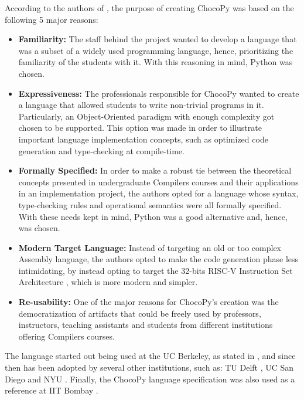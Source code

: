 \begin{itemize}
    According to the authors of \cite{padhye2019chocopy}, the purpose of creating ChocoPy was based on the following 5 major reasons:
    \begin{itemize}
        \item \textbf{Familiarity:} The staff behind the project wanted to develop a language that was a subset of a widely used programming language, hence, prioritizing the familiarity of the students with it. With this reasoning in mind, Python \cite{python_language} was chosen.
        \item \textbf{Expressiveness:} The professionals responsible for ChocoPy wanted to create a language that allowed students to write non-trivial programs in it. Particularly, an Object-Oriented paradigm with enough complexity got chosen to be supported. This option was made in order to illustrate important language implementation concepts, such as optimized code generation and type-checking at compile-time. 
        \item \textbf{Formally Specified:} In order to make a robust tie between the theoretical concepts presented in undergraduate Compilers courses and  their applications in an implementation project, the authors opted for a language whose syntax, type-checking rules and operational semantics were all formally specified. With these needs kept in mind, Python was a good alternative and, hence, was chosen.
        \item \textbf{Modern Target Language:} Instead of targeting an old or too complex Assembly language, the authors opted to make the code generation phase less intimidating, by instead opting to target the 32-bits RISC-V Instruction Set Architecture \cite{riscv_instruction_set_manual}, which is more modern and simpler.
        \item \textbf{Re-usability:} One of the major reasons for ChocoPy's creation was the democratization of artifacts that could be freely used by professors, instructors, teaching assistants and students from different institutions offering Compilers courses.
    \end{itemize}

    The language started out being used at the UC Berkeley, as stated in \cite{padhye2019chocopy}, and since then has been adopted by several other institutions, such as: TU Delft \cite{tu_delft_cs4200_2020_compiler_construction_course_page}, UC San Diego \cite{uc_san_diego_cse213_winter2021_advanced_compiler_design_course_page} and NYU \cite{nyu_2020_compiler_construction_course_page}. Finally, the ChocoPy language specification was also used as a reference at IIT Bombay \cite{iit_bombay_sclp}.


\end{itemize}
